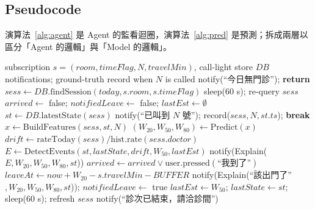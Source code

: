 \documentclass[11pt,twocolumn]{article}
\begin{document}
\subsection{Pseudocode}
演算法~\ref{alg:agent} 是 Agent 的監看迴圈，演算法~\ref{alg:pred} 是預測；拆成兩層以區分「Agent 的邏輯」與「Model 的邏輯」。

\begin{algorithm}[!htb]
\caption{Queue Agent --- Subscription Monitoring Loop}
\label{alg:agent}
\linespread{1.0}\selectfont\begin{algorithmic}[1]\footnotesize
\REQUIRE subscription $s=(\mathit{room},\mathit{timeFlag},N,\mathit{travelMin})$, call-light store $\mathit{DB}$
\ENSURE notifications; ground-truth record when $N$ is called
 \STATE notify(``今日無門診''); \textbf{return} \ENDIF
\STATE $\mathit{sess} \leftarrow \mathit{DB}.\mathrm{findSession}(\mathit{today}, s.\mathit{room}, s.\mathit{timeFlag})$
 \STATE sleep(60 s); re-query $\mathit{sess}$  \ENDWHILE
\STATE $\mathit{arrived}\leftarrow$ false; $\mathit{notifiedLeave}\leftarrow$ false; $\mathit{lastEst}\leftarrow\emptyset$
  \STATE $st \leftarrow \mathit{DB}.\mathrm{latestState}(\mathit{sess})$ 
    \STATE notify(``已叫到 $N$ 號''); record($\mathit{sess},N,st.ts$); \textbf{break}
  \ENDIF
  \STATE $x \leftarrow \mathrm{BuildFeatures}(\mathit{sess}, st, N)$ 
  \STATE $(W_{20},W_{50},W_{80}) \leftarrow \mathrm{Predict}(x)$
  \STATE $\mathit{drift} \leftarrow \mathrm{rateToday}(\mathit{sess})/\mathrm{hist.rate}(\mathit{sess}.\mathit{doctor})$
  \STATE $E \leftarrow \mathrm{DetectEvents}(st,\mathit{lastState},\mathit{drift},W_{50},\mathit{lastEst})$
  \STATE {}
  \STATE {}
   \STATE notify(Explain($E,W_{20},W_{50},W_{80},st$)) \ENDIF
  \STATE $\mathit{arrived} \leftarrow \mathit{arrived} \lor \mathrm{user.pressed}(\text{``我到了''})$
  \STATE $\mathit{leaveAt} \leftarrow \mathit{now} + W_{20} - s.\mathit{travelMin} - \mathit{BUFFER}$
    \STATE notify(Explain(``該出門了''$,W_{20},W_{50},W_{80},st$)); $\mathit{notifiedLeave}\leftarrow$ true
  \ENDIF
  \STATE $\mathit{lastEst}\leftarrow W_{50}$; $\mathit{lastState}\leftarrow st$; sleep(60 s); refresh $\mathit{sess}$
\ENDWHILE
{} \STATE notify(``診次已結束，請洽診間'') \ENDIF
\end{algorithmic}
\end{algorithm}
\end{document}
